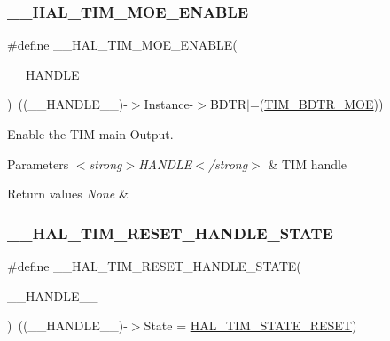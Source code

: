 \subsubsection{\texorpdfstring{\_\_HAL\_TIM\_MOE\_ENABLE}{\_\_HAL\_TIM\_MOE\_ENABLE}}
{\footnotesize\ttfamily \#define \+\_\+\+\_\+\+H\+A\+L\+\_\+\+T\+I\+M\+\_\+\+M\+O\+E\+\_\+\+E\+N\+A\+B\+LE(\begin{DoxyParamCaption}\item[{}]{\+\_\+\+\_\+\+H\+A\+N\+D\+L\+E\+\_\+\+\_\+ }\end{DoxyParamCaption})~((\+\_\+\+\_\+\+H\+A\+N\+D\+L\+E\+\_\+\+\_\+)-\/$>$Instance-\/$>$B\+D\+TR$\vert$=(\mbox{\hyperlink{group___peripheral___registers___bits___definition_ga277a096614829feba2d0a4fbb7d3dffc}{T\+I\+M\+\_\+\+B\+D\+T\+R\+\_\+\+M\+OE}}))}



Enable the T\+IM main Output. 


\begin{DoxyParams}{Parameters}
{\em $<$strong$>$\+H\+A\+N\+D\+L\+E$<$/strong$>$} & T\+IM handle \\
\hline
\end{DoxyParams}

\begin{DoxyRetVals}{Return values}
{\em None} & \\
\hline
\end{DoxyRetVals}
\mbox{\label{group___t_i_m___exported___macros_gace20fd4e38231b9682fbc83a80ec19a3}} 
\subsubsection{\texorpdfstring{\_\_HAL\_TIM\_RESET\_HANDLE\_STATE}{\_\_HAL\_TIM\_RESET\_HANDLE\_STATE}}
{\footnotesize\ttfamily \#define \+\_\+\+\_\+\+H\+A\+L\+\_\+\+T\+I\+M\+\_\+\+R\+E\+S\+E\+T\+\_\+\+H\+A\+N\+D\+L\+E\+\_\+\+S\+T\+A\+TE(\begin{DoxyParamCaption}\item[{}]{\+\_\+\+\_\+\+H\+A\+N\+D\+L\+E\+\_\+\+\_\+ }\end{DoxyParamCaption})~((\+\_\+\+\_\+\+H\+A\+N\+D\+L\+E\+\_\+\+\_\+)-\/$>$State = \mbox{\hyperlink{group___t_i_m___exported___types_ggae0994cf5970e56ca4903e9151f40010ca28011b79e60b74a6c55947c505c51cbc}{H\+A\+L\+\_\+\+T\+I\+M\+\_\+\+S\+T\+A\+T\+E\+\_\+\+R\+E\+S\+ET}})}



